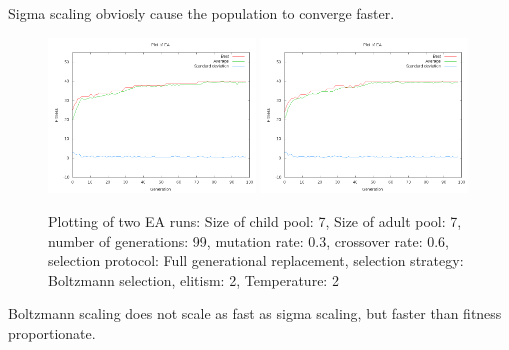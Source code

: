 \documentclass[11pt]{article}
\begin{document}
Sigma scaling obviosly cause the population to converge faster.

\begin{figure}[ht]
\begin{center}
\mbox{\includegraphics[width=0.49\textwidth]{images/bol1.png}}
\mbox{\includegraphics[width=0.49\textwidth]{images/bol2.png}}
\end{center}
\caption{Plotting of two EA runs:
Size of child pool: 7,
Size of adult pool: 7,
number of generations: 99,
mutation rate: 0.3,
crossover rate: 0.6,
selection protocol: Full generational replacement,
selection strategy: Boltzmann selection,
elitism: 2,
Temperature: 2}
\label{fig:7}
\end{figure}

Boltzmann scaling does not scale as fast as sigma scaling, but faster than
fitness proportionate.
\end{document}
